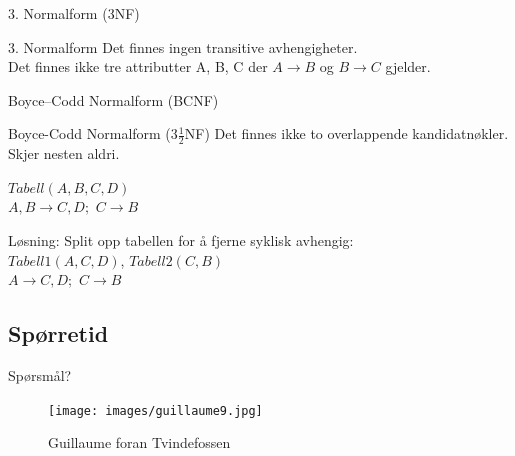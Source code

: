 \begin{frame}{3. Normalform (3NF)}
\begin{block}{3. Normalform}
    Det finnes ingen transitive avhengigheter.\\
    Det finnes ikke tre attributter A, B, C der $A \rightarrow B$ og $B \rightarrow C$ gjelder.
    \end{block}
    \vfill
\end{frame}

\begin{frame}{Boyce–Codd Normalform (BCNF)}
\begin{block}{Boyce-Codd Normalform ($3 \frac{1}{2}$NF)}
    Det finnes ikke to overlappende kandidatnøkler. Skjer nesten aldri.
    \end{block}
    \vfill
    $Tabell(A, B, C, D)$\\
    $A,B\rightarrow C,D; $ $C\rightarrow B$\medskip
    
    \pause
    Løsning: Split opp tabellen for å fjerne syklisk avhengig:\\
    $Tabell1(A, C, D)$, $Tabell2(C, B)$\\
    $A\rightarrow C,D; $ $C\rightarrow B$\medskip
\end{frame}

\subsection*{Spørretid}
\begin{frame}{Spørsmål?}
    \begin{figure}
        \centering
        \texttt{[image: images/guillaume9.jpg]}
        \caption{Guillaume foran Tvindefossen}
        \label{fig:guillaume9}
    \end{figure}
\end{frame}


